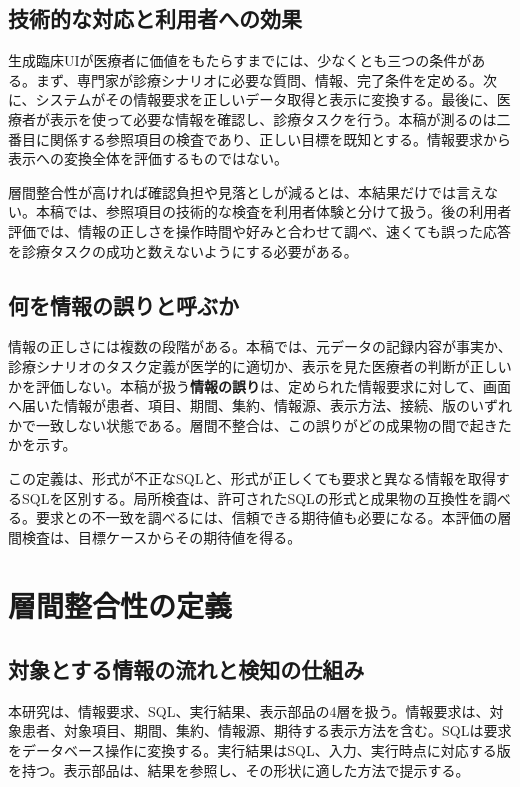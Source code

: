 \documentclass[manuscript,review,anonymous]{acmart}
\newcommand{\term}[1]{\textbf{#1}}
\begin{document}
\subsection{技術的な対応と利用者への効果}

生成臨床UIが医療者に価値をもたらすまでには、少なくとも三つの条件がある。まず、専門家が診療シナリオに必要な質問、情報、完了条件を定める。次に、システムがその情報要求を正しいデータ取得と表示に変換する。最後に、医療者が表示を使って必要な情報を確認し、診療タスクを行う。本稿が測るのは二番目に関係する参照項目の検査であり、正しい目標を既知とする。情報要求から表示への変換全体を評価するものではない。

層間整合性が高ければ確認負担や見落としが減るとは、本結果だけでは言えない。本稿では、参照項目の技術的な検査を利用者体験と分けて扱う。後の利用者評価では、情報の正しさを操作時間や好みと合わせて調べ、速くても誤った応答を診療タスクの成功と数えないようにする必要がある。

\subsection{何を情報の誤りと呼ぶか}

情報の正しさには複数の段階がある。本稿では、元データの記録内容が事実か、診療シナリオのタスク定義が医学的に適切か、表示を見た医療者の判断が正しいかを評価しない。本稿が扱う\term{情報の誤り}は、定められた情報要求に対して、画面へ届いた情報が患者、項目、期間、集約、情報源、表示方法、接続、版のいずれかで一致しない状態である。層間不整合は、この誤りがどの成果物の間で起きたかを示す。

この定義は、形式が不正なSQLと、形式が正しくても要求と異なる情報を取得するSQLを区別する。局所検査は、許可されたSQLの形式と成果物の互換性を調べる。要求との不一致を調べるには、信頼できる期待値も必要になる。本評価の層間検査は、目標ケースからその期待値を得る。

\section{層間整合性の定義}

\subsection{対象とする情報の流れと検知の仕組み}

本研究は、情報要求、SQL、実行結果、表示部品の4層を扱う。情報要求は、対象患者、対象項目、期間、集約、情報源、期待する表示方法を含む。SQLは要求をデータベース操作に変換する。実行結果はSQL、入力、実行時点に対応する版を持つ。表示部品は、結果を参照し、その形状に適した方法で提示する。
\end{document}
